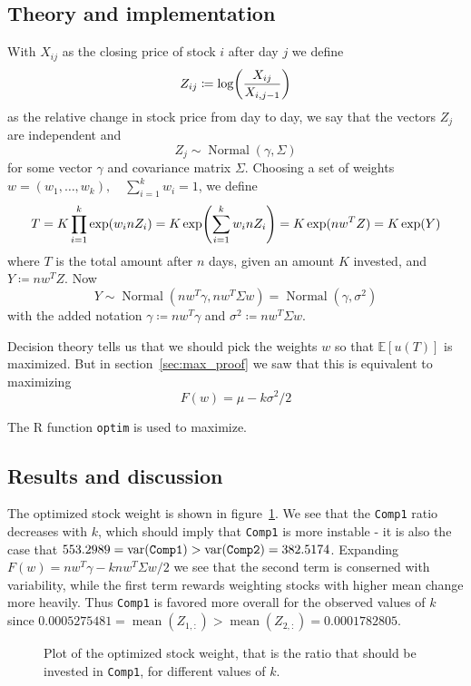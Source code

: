 \documentclass[11pt, a4paper]{article}
\let\originalleft\left
\let\originalright\right
\renewcommand{\left}{\mathopen{}\mathclose\bgroup\originalleft}
\renewcommand{\right}{\aftergroup\egroup\originalright}
\DeclareMathOperator{\Normal}{Normal}
\DeclareMathOperator{\mean}{mean}
\DeclareMathOperator{\var}{var}
\begin{document}
\subsection{Theory and implementation}
With $X_{ij}$ as the closing price of stock $i$ after day $j$ we define
$$ Z_{ij} \coloneqq \log\left(\frac{X_{ij}}{X_{i,j-1}}\right) $$
as the relative change in stock price from day to day,
we say that the vectors $Z_j$ are independent and
$$ Z_j \sim \Normal(\gamma, \Sigma) $$
for some vector $\gamma$ and covariance matrix $\Sigma$.
Choosing a set of weights $w = (w_1, \ldots, w_k), \quad \sum_{i=1}^k w_i = 1$,
we define
$$ T = K \prod_{i=1}^k \exp(w_i n Z_i) = K \exp\left(\sum_{i=1}^k w_i n Z_i\right)
	= K \exp(n w^T Z) = K \exp(Y) $$
where $T$ is the total amount after $n$ days, given an amount $K$ invested,
and $Y \coloneqq n w^T Z$.
Now
$$ Y \sim \Normal(n w^T \gamma, n w^T \Sigma w) = \Normal(\gamma, \sigma^2) $$
with the added notation
$\gamma \coloneqq n w^T \gamma$ and $\sigma^2 \coloneqq n w^T \Sigma w$.

Decision theory tells us that we should pick the weights $w$ so that
$\mathbb E[u(T)]$ is maximized.
But in section~\ref{sec:max_proof} we saw that this is equivalent to maximizing
$$ F(w) = \mu - k \sigma^2 / 2 $$

The R function \texttt{optim} is used to maximize.
\subsection{Results and discussion}
The optimized stock weight is shown in figure~\ref{fig:stock_weights}.
We see that the \texttt{Comp1} ratio decreases with $k$,
which should imply that \texttt{Comp1} is more instable
- it is also the case that
$\num{553.2989} = \var(\text{\texttt{Comp1}}) > \var(\text{\texttt{Comp2}}) = \num{382.5174}$.
Expanding $F(w) = n w^T \gamma - k n w^T \Sigma w / 2$
we see that the second term is conserned with variability,
while the first term rewards weighting stocks with higher mean change more heavily.
Thus \texttt{Comp1} is favored more overall for the observed values of $k$
since $\num{0.0005275481} = \mean(Z_{1,:}) > \mean(Z_{2,:}) = \num{0.0001782805}$.

\begin{figure}
	\centering
	
	\caption{Plot of the optimized stock weight,
		that is the ratio that should be invested in \texttt{Comp1},
	for different values of $k$. \label{fig:stock_weights}}
\end{figure}
\end{document}
